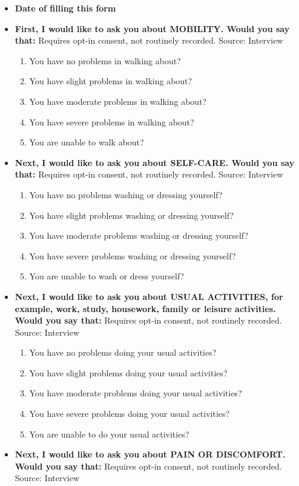 \documentclass[
]{scrartcl}
\providecommand{\tightlist}{%
  \setlength{\itemsep}{0pt}\setlength{\parskip}{0pt}}\usepackage{longtable,booktabs,array}
\begin{document}
\begin{itemize}
\item
  \textbf{Date of filling this form}
\item
  \textbf{First, I would like to ask you about MOBILITY. Would you say
  that:} Requires opt-in consent, not routinely recorded. Source:
  Interview

  \begin{enumerate}
  \def\labelenumi{\arabic{enumi}.}
  \tightlist
  \item
    You have no problems in walking about?
  \item
    You have slight problems in walking about?
  \item
    You have moderate problems in walking about?
  \item
    You have severe problems in walking about?
  \item
    You are unable to walk about?
  \end{enumerate}
\item
  \textbf{Next, I would like to ask you about SELF-CARE. Would you say
  that:} Requires opt-in consent, not routinely recorded. Source:
  Interview

  \begin{enumerate}
  \def\labelenumi{\arabic{enumi}.}
  \tightlist
  \item
    You have no problems washing or dressing yourself?
  \item
    You have slight problems washing or dressing yourself?
  \item
    You have moderate problems washing or dressing yourself?
  \item
    You have severe problems washing or dressing yourself?
  \item
    You are unable to wash or dress yourself?
  \end{enumerate}
\item
  \textbf{Next, I would like to ask you about USUAL ACTIVITIES, for
  example, work, study, housework, family or leisure activities. Would
  you say that:} Requires opt-in consent, not routinely recorded.
  Source: Interview

  \begin{enumerate}
  \def\labelenumi{\arabic{enumi}.}
  \tightlist
  \item
    You have no problems doing your usual activities?
  \item
    You have slight problems doing your usual activities?
  \item
    You have moderate problems doing your usual activities?
  \item
    You have severe problems doing your usual activities?
  \item
    You are unable to do your usual activities?
  \end{enumerate}
\item
  \textbf{Next, I would like to ask you about PAIN OR DISCOMFORT. Would
  you say that:} Requires opt-in consent, not routinely recorded.
  Source: Interview


\end{itemize}
\end{document}
